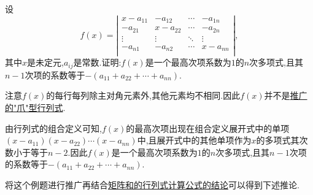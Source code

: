 \documentclass[../../main.tex]{subfiles}%
\begin{document}
\begin{example}\label{example:特征行列式写成多项式形式的系数}
设
\[
f(x)=\left| \begin{matrix}
x-a_{11}&		-a_{12}&		\cdots&		-a_{1n}\\
-a_{21}&		x-a_{22}&		\cdots&		-a_{2n}\\
\vdots&		\vdots&		\ddots&		\vdots\\
-a_{n1}&		-a_{n2}&		\cdots&		x-a_{nn}\\
\end{matrix} \right|,
\]
其中\(x\)是未定元,\(a_{ij}\)是常数.证明:\(f(x)\)是一个最高次项系数为\(1\)的\(n\)次多项式,且其\(n - 1\)次项的系数等于\(-(a_{11}+a_{22}+\cdots + a_{nn})\).
\end{example}
\begin{note}
注意$f(x)$的每行每列除主对角元素外,其他元素均不相同.因此$f(x)$并不是\hyperref["爪"型行列式的推广]{推广的"爪"型行列式}.
\end{note}
\begin{solution}

由行列式的组合定义可知,\(f(x)\)的最高次项出现在组合定义展开式中的单项\((x - a_{11})(x - a_{22})\cdots(x - a_{nn})\)中,且展开式中的其他单项作为\(x\)的多项式其次数小于等于\(n - 2\).因此\(f(x)\)是一个最高次项系数为\(1\)的\(n\)次多项式,且其\(n - 1\)次项的系数等于\(-(a_{11}+a_{22}+\cdots + a_{nn})\).

\end{solution}
\begin{remark}
将这个例题进行推广再结合\hyperref[proposition:矩阵和的行列式计算公式]{矩阵和的行列式计算公式的结论}可以得到下述推论.
\end{remark}
\end{document}
